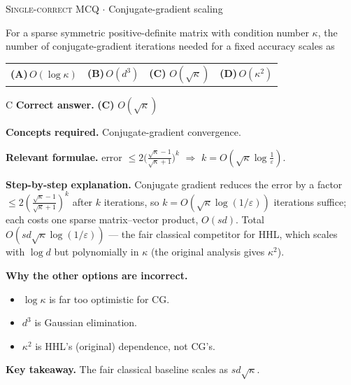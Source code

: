\documentclass[11pt,a4paper]{article}
\newcommand{\optlabel}[1]{\textbf{(#1)}}
\newcommand{\correctlabel}[1]{\textcolor{okgreen}{\textbf{(#1)}\,\ding{51}}}
\newenvironment{qitem}[1]{\begin{list}{}{\setlength{\leftmargin}{3.3em}\setlength{\labelwidth}{3.1em}%
  \setlength{\labelsep}{0.2em}\setlength{\topsep}{3pt}\setlength{\parsep}{3pt}}\item[\textbf{Q.#1}\hfill]}{\end{list}}
\newcommand{\qsep}{\par\vspace{2pt}{\color{black!15}\hrule}\vspace{4pt}}
\newcommand{\qmeta}[2]{{\footnotesize\color{black!60}\textsc{#1} \;$\cdot$\; #2}\par}
\begin{document}
\begin{qitem}{11}
\qmeta{Single-correct MCQ}{Conjugate-gradient scaling}
For a sparse symmetric positive-definite matrix with condition number $\kappa$, the number of conjugate-gradient iterations needed for a fixed accuracy
scales as
\par\smallskip\noindent\begin{tabularx}{\linewidth}{@{}*{4}{L}@{}}
\optlabel{A}\,$O(\log\kappa)$ & \optlabel{B}\,$O(d^3)$ & \correctlabel{C}\,$O(\sqrt\kappa)$ & \optlabel{D}\,$O(\kappa^2)$
\end{tabularx}
\end{qitem}
\begin{solbox}{C}
\textbf{\color{brand}Correct answer.} \textcolor{okgreen}{\textbf{(C)}} $O(\sqrt\kappa)$

\textbf{\color{brand}Concepts required.} Conjugate-gradient convergence.

\textbf{\color{brand}Relevant formulae.} error $\le 2\big(\frac{\sqrt\kappa - 1}{\sqrt\kappa + 1}\big)^k$ $\Rightarrow$ $k = O(\sqrt\kappa\log\frac1\varepsilon)$.

\textbf{\color{brand}Step-by-step explanation.} Conjugate gradient reduces the error by a factor $\le 2\left(\frac{\sqrt\kappa - 1}{\sqrt\kappa + 1}\right)^k$ after $k$ iterations, so $k = O(\sqrt\kappa\log(1/\varepsilon))$ iterations
suffice; each costs one sparse matrix--vector product, $O(sd)$. Total $O(sd\sqrt\kappa\log(1/\varepsilon))$ --- the fair classical competitor for HHL, which
scales with $\log d$ but polynomially in $\kappa$ (the original analysis gives $\kappa^2$).

\textbf{\color{brand}Why the other options are incorrect.}
\begin{itemize}[leftmargin=2.4em, itemsep=1pt, topsep=2pt]
\item[\textbf{(A)}] $\log\kappa$ is far too optimistic for CG.
\item[\textbf{(B)}] $d^3$ is Gaussian elimination.
\item[\textbf{(D)}] $\kappa^2$ is HHL's (original) dependence, not CG's.
\end{itemize}
\textbf{\color{brand}Key takeaway.} The fair classical baseline scales as $sd\sqrt\kappa$.
\end{solbox}
\qsep
\end{document}

